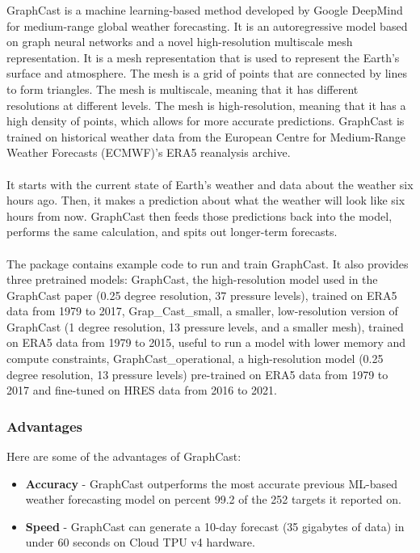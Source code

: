 \documentclass[../paper.tex]{subfiles}
\begin{document}
    GraphCast is a machine learning-based method developed by Google DeepMind for medium-range global weather forecasting.
    It is an autoregressive model based on graph neural networks and a novel high-resolution multiscale mesh representation.
    It is a mesh representation that is used to represent the Earth's surface and atmosphere.
    The mesh is a grid of points that are connected by lines to form triangles.
    The mesh is multiscale, meaning that it has different resolutions at different levels.
    The mesh is high-resolution, meaning that it has a high density of points, which allows for more accurate predictions.
    GraphCast is trained on historical weather data from the European Centre for Medium-Range Weather Forecasts (ECMWF)'s ERA5 reanalysis archive\cite{e1}.
    \\\\
    It starts with the current state of Earth's weather and data about the weather six hours ago.
    Then, it makes a prediction about what the weather will look like six hours from now.
    GraphCast then feeds those predictions back into the model, performs the same calculation, and spits out longer-term forecasts\cite{e1}.
    \\\\
    The package contains example code to run and train GraphCast.
    It also provides three pretrained models: GraphCast, the high-resolution model used in the GraphCast paper (0.25 degree resolution, 37 pressure levels),
    trained on ERA5 data from 1979 to 2017, Grap\_Cast\_small, a smaller, low-resolution version of GraphCast (1 degree resolution,
    13 pressure levels, and a smaller mesh), trained on ERA5 data from 1979 to 2015, useful to run a model with lower memory and compute constraints,
    GraphCast\_operational, a high-resolution model (0.25 degree resolution, 13 pressure levels) pre-trained on ERA5 data from 1979 to 2017
    and fine-tuned on HRES data from 2016 to 2021\cite{e2}.

    \subsubsection{Advantages}
    Here are some of the advantages of GraphCast:
    \begin{itemize}
        \item \textbf{Accuracy} - GraphCast outperforms the most accurate previous ML-based weather forecasting model on percent 99.2 of the 252 targets it reported on\cite{e1}.
        \item \textbf{Speed} - GraphCast can generate a 10-day forecast (35 gigabytes of data) in under 60 seconds on Cloud TPU v4 hardware\cite{e1}.
    \end{itemize}
\end{document}
